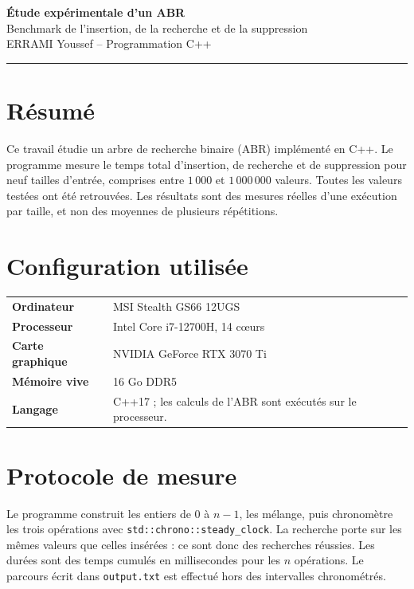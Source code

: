 \documentclass[10pt,a4paper]{article}
\begin{document}
\begin{center}
    {\LARGE\bfseries\color{bleu} Étude expérimentale d'un ABR}\\[-1pt]
    {\large Benchmark de l'insertion, de la recherche et de la suppression}\\[2pt]
    {\normalsize ERRAMI Youssef \quad -- \quad Programmation C++}
\end{center}
\vspace{-3pt}
\hrule

\section{Résumé}
Ce travail étudie un arbre de recherche binaire (ABR) implémenté en C++.
Le programme mesure le temps total d'insertion, de recherche et de
suppression pour neuf tailles d'entrée, comprises entre $1\,000$ et
$1\,000\,000$ valeurs. Toutes les valeurs testées ont été retrouvées.
Les résultats sont des mesures réelles d'une exécution par taille, et non
des moyennes de plusieurs répétitions.

\section{Configuration utilisée}
\renewcommand{\arraystretch}{1.03}
\begin{tabular}{@{}>{\bfseries}p{3.1cm}p{12cm}@{}}
Ordinateur & MSI Stealth GS66 12UGS\\
Processeur & Intel Core i7-12700H, 14 cœurs\\
Carte graphique & NVIDIA GeForce RTX 3070 Ti\\
Mémoire vive & 16 Go DDR5\\
Langage & C++17 ; les calculs de l'ABR sont exécutés sur le processeur.
\end{tabular}

\section{Protocole de mesure}
Le programme construit les entiers de $0$ à $n-1$, les mélange, puis
chronomètre les trois opérations avec \texttt{std::chrono::steady\_clock}.
La recherche porte sur les mêmes valeurs que celles insérées : ce sont
donc des recherches réussies. Les durées sont des temps cumulés en
millisecondes pour les $n$ opérations. Le parcours écrit dans
\texttt{output.txt} est effectué hors des intervalles chronométrés.
\end{document}
